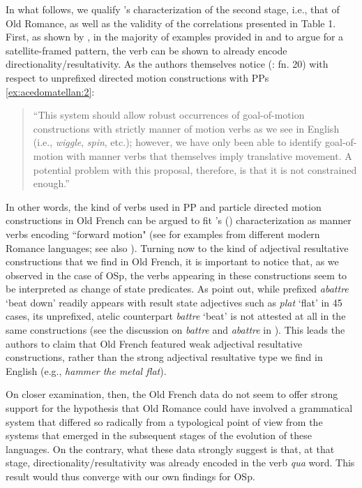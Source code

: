 \documentclass[output=paper,colorlinks,citecolor=brown,
]{langscibook}
\begin{document}
In what follows, we qualify \citeauthor{trobergburnett}'s characterization of the second stage, i.e., that of Old Romance, as well as the validity of the correlations presented in Table 1. First, as shown by \citet{Acedo-Matellaninprep}, in the majority of examples provided in \citet{trobergburnett} and \citet{TrobergandBurnett2017} to argue for a satellite-framed pattern, the verb can be shown to already encode directionality/resultativity. As the authors themselves notice (\citeyear{TrobergandBurnett2017}: fn. 20) with respect to unprefixed directed motion constructions with PPs \ref{ex:acedomatellan:2}:

\begin{quotation}
``This system should allow robust occurrences of goal-of-motion constructions with strictly manner of motion verbs as we see in English (i.e., \textit{wiggle}, \textit{spin}, etc.); however, we have only been able to identify goal-of-motion with manner verbs that themselves imply translative movement. A potential problem with this proposal, therefore, is that it is not constrained enough.''
\end{quotation}

\noindent In other words, the kind of verbs used in PP and particle directed motion constructions in Old French can be argued to fit \citeauthor{Nichols2008}'s (\citeyear{Nichols2008}) characterization as manner verbs encoding ``forward motion"  (see \citealt{Real-Puigdollers2010} for examples from different modern Romance languages; see also \citealt{Acedo-MatellanandMateu2015}). Turning now to the kind of adjectival resultative constructions that we find in Old French, it is important to notice that, as we observed in the case of OSp, the verbs appearing in these constructions seem to be interpreted as change of state predicates. As \citet{trobergburnett} point out, while prefixed \textit{abattre} `beat down’ readily appears with result state adjectives such as \textit{plat} `flat’ in 45 cases, its unprefixed, atelic counterpart \textit{battre} `beat’ is not attested at all in the same constructions (see the discussion on \textit{battre} and \textit{abattre} in ). This leads the authors to claim that Old French featured weak adjectival resultative constructions, rather than the strong adjectival resultative type we find in English (e.g., \textit{hammer the metal flat}).

On closer examination, then, the Old French data do not seem to offer strong support for the hypothesis that Old Romance could have involved a grammatical system that differed so radically from a typological point of view from the systems that emerged in the subsequent stages of the evolution of these languages. On the contrary, what these data strongly suggest is that, at that stage, directionality/resultativity was already encoded in the verb \textit{qua} word. This result would thus converge with our own findings for OSp.  
\end{document}
